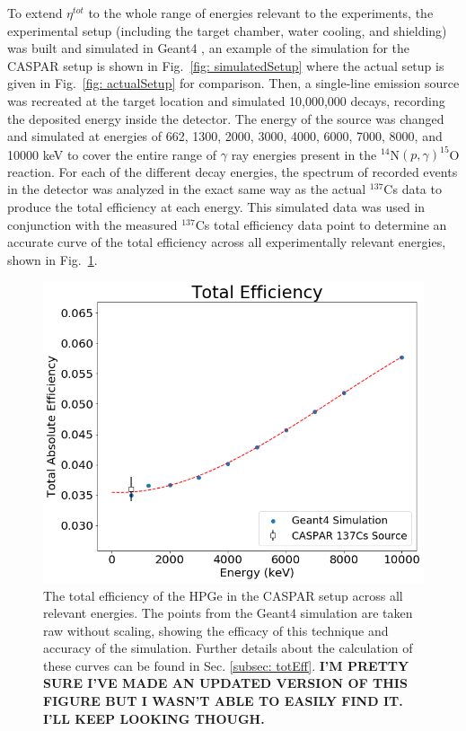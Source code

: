 To extend $\eta^{tot}$ to the whole range of energies relevant to the experiments, the experimental setup (including the target chamber, water cooling, and shielding) was built and simulated in Geant4 \cite{Agostinelli2003}, an example of the simulation for the CASPAR setup is shown in Fig.\ \ref{fig: simulatedSetup} where the actual setup is given in Fig.\ \ref{fig: actualSetup} for comparison. Then, a single-line emission source was recreated at the target location and simulated 10,000,000 decays, recording the deposited energy inside the detector. The energy of the source was changed and simulated at energies of 662, 1300, 2000, 3000, 4000, 6000, 7000, 8000, and 10000 keV to cover the entire range of $\gamma$ ray energies present in the $^{14}$N$\left( p,\gamma \right) ^{15}$O reaction. For each of the different decay energies, the spectrum of recorded events in the detector was analyzed in the exact same way as the actual $^{137}$Cs data to produce the total efficiency at each energy. This simulated data was used in conjunction with the measured $^{137}$Cs total efficiency data point to determine an accurate curve of the total efficiency across all experimentally relevant energies, shown in Fig.\ \ref{fig: totalEfficiency}.

\begin{figure}
\centering
\includegraphics[width=\linewidth]{figures/totalEfficiency.png}
\caption{The total efficiency of the HPGe in the CASPAR setup across all relevant energies. The points from the Geant4 simulation are taken raw without scaling, showing the efficacy of this technique and accuracy of the simulation. Further details about the calculation of these curves can be found in Sec. \ref{subsec: totEff}. \textbf{I'M PRETTY SURE I'VE MADE AN UPDATED VERSION OF THIS FIGURE BUT I WASN'T ABLE TO EASILY FIND IT. I'LL KEEP LOOKING THOUGH.}}
\label{fig: totalEfficiency}
\end{figure}



